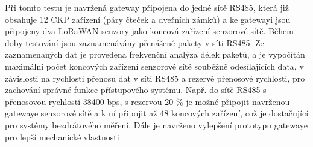 Při tomto testu je navržená gateway připojena do jedné sítě RS485, která již obsahuje 12 CKP zařízení (páry čteček a dveřních zámků) a ke gatewayi jsou připojeny dva LoRaWAN senzory jako koncová zařízení senzorové sítě.
Během doby testování jsou zaznamenávány přenášené pakety v síti RS485.
Ze zaznamenaných dat je provedena frekvenční analýza délek paketů, a je vypočítán maximální počet koncových zařízení senzorové sítě souběžně odesílajících data, v závislosti na rychlosti přenosu dat v síti RS485 a rezervě přenosové rychlosti, pro zachování správné funkce přístupového systému.
Např. do sítě RS485 s přenosovou rychlostí 38400 bps, s rezervou 20 \% je možné připojit navrženou gatewaye senzorové sítě a k ní připojit až 48 koncových zařízení, což je dostačující pro systémy bezdrátového měření.
\DIFaddbegin {}\label{Návrh vylepšení systému} \DIFaddend Dále je \DIFaddbegin {}\DIFaddend navrženo vylepšení prototypu gatewaye pro lepší mechanické vlastnosti\DIFdelbegin {}\DIFdelend \DIFaddbegin {}






